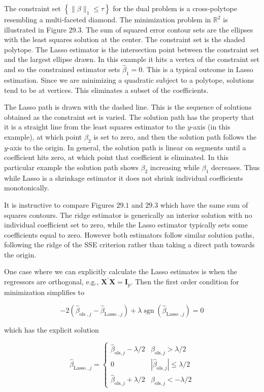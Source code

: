 \documentclass[10pt]{article}
\begin{document}
The constraint set $\left\{\|\beta\|_{1} \leq \tau\right\}$ for the dual problem is a cross-polytope resembling a multi-faceted diamond. The minimization problem in $\mathbb{R}^{2}$ is illustrated in Figure 29.3. The sum of squared error contour sets are the ellipses with the least squares solution at the center. The constraint set is the shaded polytope. The Lasso estimator is the intersection point between the constraint set and the largest ellipse drawn. In this example it hits a vertex of the constraint set and so the constrained estimator sets $\widehat{\beta}_{1}=0$. This is a typical outcome in Lasso estimation. Since we are minimizing a quadratic subject to a polytope, solutions tend to be at vertices. This eliminates a subset of the coefficients.

The Lasso path is drawn with the dashed line. This is the sequence of solutions obtained as the constraint set is varied. The solution path has the property that it is a straight line from the least squares estimator to the $y$-axis (in this example), at which point $\beta_{2}$ is set to zero, and then the solution path follows the $y$-axis to the origin. In general, the solution path is linear on segments until a coefficient hits zero, at which point that coefficient is eliminated. In this particular example the solution path shows $\beta_{2}$ increasing while $\beta_{1}$ decreases. Thus while Lasso is a shrinkage estimator it does not shrink individual coefficients monotonically.

It is instructive to compare Figures $29.1$ and $29.3$ which have the same sum of squares contours. The ridge estimator is generically an interior solution with no individual coefficient set to zero, while the Lasso estimator typically sets some coefficients equal to zero. However both estimators follow similar solution paths, following the ridge of the SSE criterion rather than taking a direct path towards the origin.

One case where we can explicitly calculate the Lasso estimates is when the regressors are orthogonal, e.g., $\boldsymbol{X}^{\prime} \boldsymbol{X}=\boldsymbol{I}_{p}$. Then the first order condition for minimization simplifies to

$$
-2\left(\widehat{\beta}_{\text {ols }, j}-\widehat{\beta}_{\text {Lasso }, j}\right)+\lambda \operatorname{sgn}\left(\widehat{\beta}_{\text {Lasso }, j}\right)=0
$$

which has the explicit solution

$$
\widehat{\beta}_{\text {Lasso }, j}=\left\{\begin{array}{cc}
\widehat{\beta}_{\mathrm{ols}, j}-\lambda / 2 & \widehat{\beta}_{\mathrm{ols}, j}>\lambda / 2 \\
0 & \left|\widehat{\beta}_{\mathrm{ols}, j}\right| \leq \lambda / 2 \\
\widehat{\beta}_{\mathrm{ols}, j}+\lambda / 2 & \widehat{\beta}_{\mathrm{ols}, j}<-\lambda / 2
\end{array}\right.
$$
\end{document}
